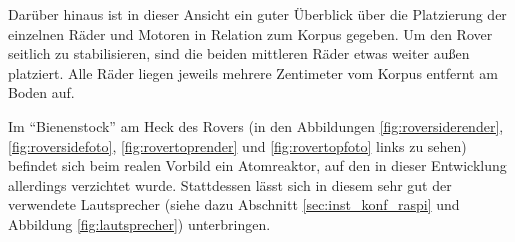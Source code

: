 Darüber hinaus ist in dieser Ansicht ein guter Überblick über die Platzierung der einzelnen Räder und Motoren in Relation zum Korpus gegeben.
Um den Rover seitlich zu stabilisieren, sind die beiden mittleren Räder etwas weiter außen platziert.
Alle Räder liegen jeweils mehrere Zentimeter vom Korpus entfernt am Boden auf.

Im \enquote{Bienenstock} am Heck des Rovers (in den Abbildungen \ref{fig:roversiderender}, \ref{fig:roversidefoto}, \ref{fig:rovertoprender} und \ref{fig:rovertopfoto} links zu sehen) befindet sich beim realen Vorbild ein Atomreaktor, auf den in dieser Entwicklung allerdings verzichtet wurde.
Stattdessen lässt sich in diesem sehr gut der verwendete Lautsprecher (siehe dazu Abschnitt \ref{sec:inst_konf_raspi} und Abbildung \ref{fig:lautsprecher}) unterbringen. 